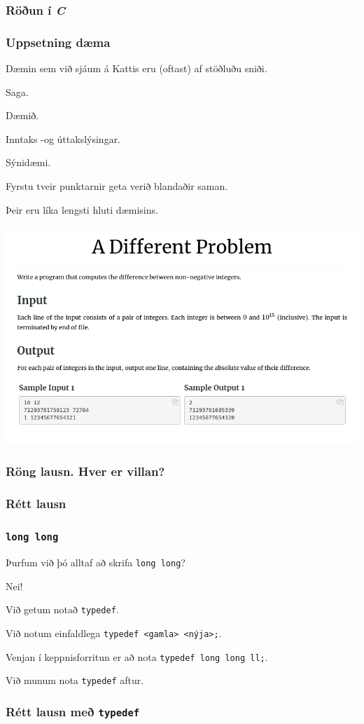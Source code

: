 {
	\frametitle{Röðun í \emph{C}}
}

{
	\frametitle{Uppsetning dæma}
	{
		\item<1-> Dæmin sem við sjáum á Kattis eru (oftast) af stöðluðu sniði.
		{
			\item<2-> Saga.
			\item<3-> Dæmið.
			\item<4-> Inntaks -og úttakslýsingar.
			\item<5-> Sýnidæmi.
		}
		\item<6-> Fyrstu tveir punktarnir geta verið blandaðir saman.
		\item<7-> Þeir eru líka lengsti hluti dæmisins.
	}
}
{
	\includegraphics[scale = 0.38]{fig/daemi}
}

{
	\frametitle{Röng lausn. Hver er villan?}
}

{
	\frametitle{Rétt lausn}
}

{
	\frametitle{\texttt{long long}}
	{
		\item<1-> Þurfum við þó alltaf að skrifa \texttt{long long}?
		\item<2-> Nei!
		\item<3-> Við getum notað \texttt{typedef}.
		\item<4-> Við notum einfaldlega \texttt{typedef <gamla> <nýja>;}.
		\item<5-> Venjan í keppnisforritun er að nota \texttt{typedef long long ll;}.
		\item<6-> Við munum nota \texttt{typedef} aftur.
	}
}

{
	\frametitle{Rétt lausn með \texttt{typedef}}
}

